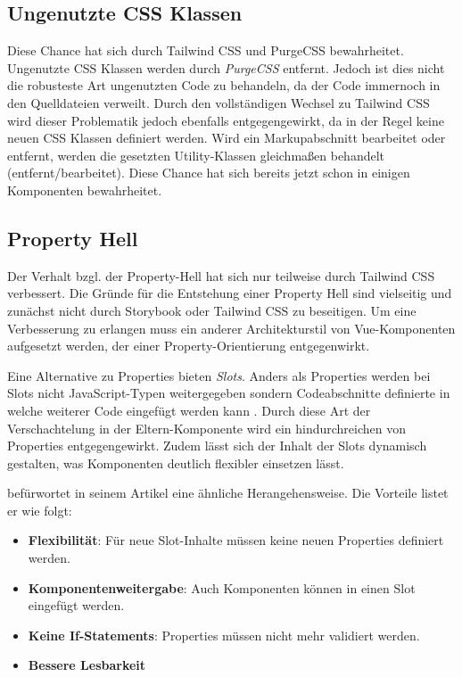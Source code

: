 \subsection{Ungenutzte CSS Klassen}
\label{subsec:unusedCSS}
Diese Chance hat sich durch Tailwind CSS und PurgeCSS bewahrheitet. Ungenutzte CSS Klassen werden durch \textit{PurgeCSS} entfernt. Jedoch ist dies nicht die robusteste Art ungenutzten Code zu behandeln, da der Code immernoch in den Quelldateien verweilt. Durch den vollständigen Wechsel zu Tailwind CSS wird dieser Problematik jedoch ebenfalls entgegengewirkt, da in der Regel keine neuen CSS Klassen definiert werden. Wird ein Markupabschnitt bearbeitet oder entfernt, werden die gesetzten Utility-Klassen gleichmaßen behandelt (entfernt/bearbeitet). Diese Chance hat sich bereits jetzt schon in einigen Komponenten bewahrheitet.

\subsection{Property Hell}
\label{sec:propertyHellSolution}
Der Verhalt bzgl. der Property-Hell hat sich nur teilweise durch Tailwind CSS verbessert. Die Gründe für die Entstehung einer Property Hell sind vielseitig und zunächst nicht durch Storybook oder
Tailwind CSS zu beseitigen. Um eine Verbesserung zu erlangen muss ein anderer Architekturstil von Vue-Komponenten aufgesetzt werden, der einer Property-Orientierung entgegenwirkt.

Eine Alternative zu Properties bieten \textit{Slots}. Anders als Properties werden bei Slots nicht JavaScript-Typen weitergegeben sondern Codeabschnitte definierte in welche weiterer Code eingefügt werden kann \citep{VueDocsSlots}. Durch diese Art der Verschachtelung in der Eltern-Komponente wird ein hindurchreichen von Properties entgegengewirkt. Zudem lässt sich der Inhalt der Slots dynamisch gestalten, was Komponenten deutlich flexibler einsetzen lässt.

\cite{SlotsPropsArticle} befürwortet in seinem Artikel eine ähnliche Herangehensweise. Die Vorteile listet er wie folgt:

\begin{itemize}
  \item \textbf{Flexibilität}: Für neue Slot-Inhalte müssen keine neuen Properties definiert werden.
  \item \textbf{Komponentenweitergabe}: Auch Komponenten können in einen Slot eingefügt werden.
  \item \textbf{Keine If-Statements}: Properties müssen nicht mehr validiert werden.
  \item \textbf{Bessere Lesbarkeit}
\end{itemize}

